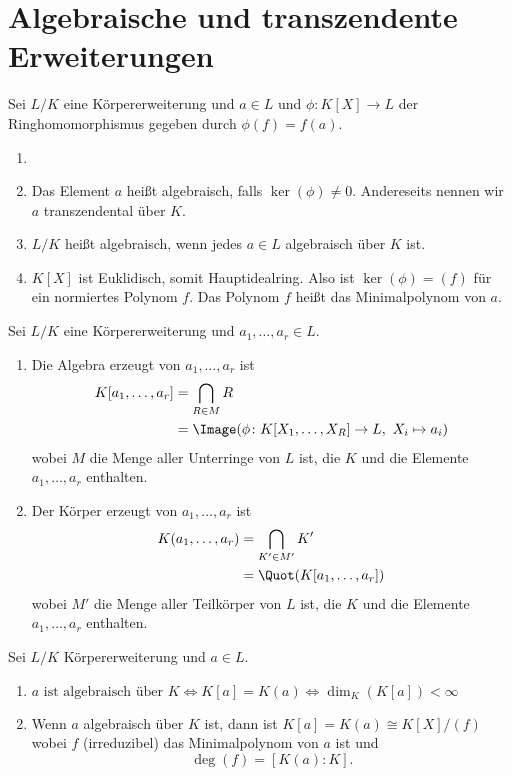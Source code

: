 \section{Algebraische und transzendente Erweiterungen}
\begin{Def}Sei \(L/K\) eine Körpererweiterung und \(a\in L\) und \(\phi\colon K[X]\to L\) der Ringhomomorphismus gegeben durch \(\phi(f)=f(a)\).
    \begin{enumerate}
        \item []
        \item  Das Element \(a\) heißt algebraisch, falls \(\ker(\phi)\neq 0\). Andereseits nennen wir \(a\) transzendental über \(K\).
        \item \(L/K\) heißt algebraisch, wenn jedes \(a\in L\) algebraisch über \(K\) ist.
        \item  \(K[X]\) ist Euklidisch, somit Hauptidealring. Also ist \(\ker(\phi)=(f)\) für ein normiertes Polynom \(f\). Das Polynom \(f\) heißt das Minimalpolynom von \(a\).
    \end{enumerate}
\end{Def}
\begin{Def}
    Sei \(L/K\) eine Körpererweiterung und \(a_1,\dots,a_r\in L\).
    \begin{enumerate}
        \item Die Algebra erzeugt von \(a_1,\dots,a_r\) ist \begin{align*} 
        K[a_1,\dots,a_r]&=\bigcap\limits_{R\in M}R\\
        &=\Image(\phi\colon K[X_1,\dots,X_R]\to L,\ X_i\mapsto a_i)
        \end{align*} wobei \(M\) die Menge aller Unterringe von \(L\) ist, die \(K\) und die Elemente \(a_1,\dots,a_r\) enthalten.
        \item Der Körper erzeugt von \(a_1,\dots,a_r\) ist \begin{align*} 
        K(a_1,\dots,a_r)&=\bigcap\limits_{K'\in M'}K'\\
        &=\Quot(K[a_1,\dots,a_r])
        \end{align*} wobei \(M'\) die Menge aller Teilkörper von \(L\) ist, die \(K\) und die Elemente \(a_1,\dots,a_r\) enthalten.
    \end{enumerate}
\end{Def}
\begin{Satz}
    Sei \(L/K\) Körpererweiterung und \(a\in L\).
    \begin{enumerate}
        \item \(a \text{ ist algebraisch über }K \iff K[a]=K(a)\iff \dim_K(K[a])<\infty\)
        \item Wenn \(a\) algebraisch über \(K\) ist, dann ist \(K[a]=K(a)\cong K[X]/(f)\) wobei \(f\) (irreduzibel) das Minimalpolynom von \(a\) ist und \[\deg(f)=[K(a):K].\]
    \end{enumerate}
\end{Satz}
